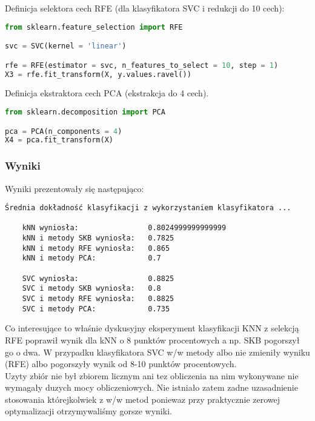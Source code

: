 Definicja selektora cech RFE (dla klasyfikatora SVC i redukcji do 10 cech):

\begin{lstlisting}[language=Python, caption=Definicja selektora RFE]
from sklearn.feature_selection import RFE

svc = SVC(kernel = 'linear')

rfe = RFE(estimator = svc, n_features_to_select = 10, step = 1)
X3 = rfe.fit_transform(X, y.values.ravel())
\end{lstlisting}

Definicja ekstraktora cech PCA (ekstrakcja do 4 cech).

\begin{lstlisting}[language=Python, caption=Definicja ekstraktora cech PCA]
from sklearn.decomposition import PCA

pca = PCA(n_components = 4)
X4 = pca.fit_transform(X)
\end{lstlisting}

\subsubsection{Wyniki}
Wyniki prezentowały się następująco:

\begin{verbatim}
Średnia dokładność klasyfikacji z wykorzystaniem klasyfikatora ...

    kNN wyniosła:                0.8024999999999999
    kNN i metody SKB wyniosła:   0.7825
    kNN i metody RFE wyniosła:   0.865
    kNN i metody PCA:            0.7

    SVC wyniosła:                0.8825
    SVC i metody SKB wyniosła:   0.8
    SVC i metody RFE wyniosła:   0.8825
    SVC i metody PCA:            0.735
\end{verbatim}

Co interesujące to właśnie dyskusyjny eksperyment klasyfikacji KNN z selekcją RFE poprawił wynik dla kNN o 8 punktów procentowych a np. SKB pogorszył go o dwa. W przypadku klasyfikatora SVC w/w metody albo nie zmieniły wyniku (RFE) albo pogorszyły wynik od 8-10 punktów procentowych.\\

Uzyty zbiór nie był zbiorem licznym ani tez obliczenia na nim wykonywane nie wymagały duzych mocy obliczeniowych. Nie istniało zatem zadne uzasadnienie stosowania którejkolwiek z w/w metod poniewaz przy praktycznie zerowej optymalizacji otrzymywaliśmy gorsze wyniki.\\

